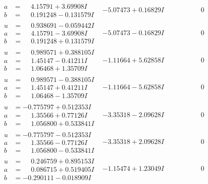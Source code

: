 \documentclass[1p]{elsarticle_modified}
\theoremstyle{definition}
\begin{document}
$$\begin{array}{c|c|c}
\begin{aligned}
a &= \phantom{-}4.15791 + 3.69908 I \\
b &= \phantom{-}0.191248 - 0.131579 I\end{aligned}
 & -5.07473 + 0.16829 I & \phantom{-0.000000 } 0 \\ \hline\begin{aligned}
u &= \phantom{-}0.938691 - 0.059442 I \\
a &= \phantom{-}4.15791 - 3.69908 I \\
b &= \phantom{-}0.191248 + 0.131579 I\end{aligned}
 & -5.07473 - 0.16829 I & \phantom{-0.000000 } 0 \\ \hline\begin{aligned}
u &= \phantom{-}0.989571 + 0.388105 I \\
a &= \phantom{-}1.45147 - 0.41211 I \\
b &= \phantom{-}1.06468 + 1.35709 I\end{aligned}
 & -1.11664 + 5.62858 I & \phantom{-0.000000 } 0 \\ \hline\begin{aligned}
u &= \phantom{-}0.989571 - 0.388105 I \\
a &= \phantom{-}1.45147 + 0.41211 I \\
b &= \phantom{-}1.06468 - 1.35709 I\end{aligned}
 & -1.11664 - 5.62858 I & \phantom{-0.000000 } 0 \\ \hline\begin{aligned}
u &= -0.775797 + 0.512353 I \\
a &= \phantom{-}1.35566 + 0.77126 I \\
b &= \phantom{-}1.056800 + 0.533841 I\end{aligned}
 & -3.35318 - 2.09628 I & \phantom{-0.000000 } 0 \\ \hline\begin{aligned}
u &= -0.775797 - 0.512353 I \\
a &= \phantom{-}1.35566 - 0.77126 I \\
b &= \phantom{-}1.056800 - 0.533841 I\end{aligned}
 & -3.35318 + 2.09628 I & \phantom{-0.000000 } 0 \\ \hline\begin{aligned}
u &= \phantom{-}0.246759 + 0.895153 I \\
a &= \phantom{-}0.086715 + 0.519405 I \\
b &= -0.290111 - 0.018909 I\end{aligned}
 & -1.15474 + 1.23049 I & \phantom{-0.000000 } 0 \\ \hline\begin{aligned}

\end{aligned}
\end{array}$$
\end{document}
